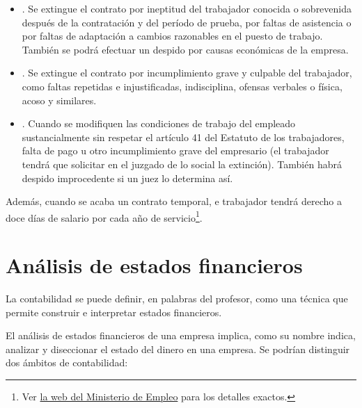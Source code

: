 \documentclass[nochap,palatino,shortheader]{apuntes}
\begin{document}
\begin{itemize}
\item {}. Se extingue el contrato por ineptitud del trabajador conocida o sobrevenida después de la contratación y del período de prueba, por faltas de asistencia o por faltas de adaptación a cambios razonables en el puesto de trabajo. También se podrá efectuar un despido por causas económicas de la empresa.
\item {}. Se extingue el contrato por incumplimiento grave y culpable del trabajador, como faltas repetidas e injustificadas, indisciplina, ofensas verbales o física, acoso y similares.
\item {}. Cuando se modifiquen las condiciones de trabajo del empleado sustancialmente sin respetar el artículo 41 del Estatuto de los trabajadores, falta de pago u otro incumplimiento grave del empresario (el trabajador tendrá que solicitar en el juzgado de lo social la extinción). También habrá despido improcedente si un juez lo determina así.
\end{itemize}

Además, cuando se acaba un contrato temporal, e trabajador tendrá derecho a doce días de salario por cada año de servicio\footnote{Ver \href{http://www.empleo.gob.es/es/Guia/texto/guia_7/contenidos/guia_7_16_4.htm}{la web del Ministerio de Empleo} para los detalles exactos.}.

\section{Análisis de estados financieros}

\begin{defn}[Contabilidad]
La contabilidad se puede definir, en palabras del profesor, como una técnica que permite construir e interpretar estados financieros.
\end{defn}

El análisis de estados financieros de una empresa implica, como su nombre indica, analizar y diseccionar el estado del dinero en una empresa. Se podrían distinguir dos ámbitos de contabilidad:
\end{document}
